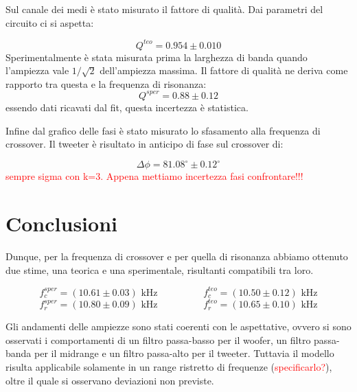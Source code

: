 \documentclass[12pt,italian]{article}
\newcommand{\err}[1]{\textcolor{red}{#1}}
\begin{document}
Sul canale dei medi è stato misurato il fattore di qualità. Dai parametri del
circuito ci si aspetta:

\begin{equation*}
	Q^{teo} = 0.954 \pm 0.010
\end{equation*}
Sperimentalmente è stata misurata prima la larghezza di banda
quando l'ampiezza vale $1/\sqrt{2}$ dell'ampiezza massima. Il fattore di
qualità ne deriva come rapporto tra questa e la frequenza di risonanza:
\begin{equation*}
	Q^{sper} = 0.88 \pm 0.12
\end{equation*}
essendo dati ricavati dal fit, questa incertezza è statistica.

Infine dal grafico delle fasi è stato misurato lo sfasamento alla frequenza di
crossover. Il tweeter è risultato in anticipo di fase sul crossover di:

\begin{equation*}
	\Delta \phi = 81.08^\circ \pm 0.12^\circ
\end{equation*}
\err{sempre sigma con k=3. Appena mettiamo incertezza fasi confrontare!!!}

\section*{Conclusioni}

Dunque, per la frequenza di crossover e per quella di risonanza abbiamo
ottenuto due stime, una teorica e una sperimentale, risultanti compatibili tra
loro.

\begin{equation*}
	f_{c}^{sper} = (10.61 \pm 0.03) \text{ kHz} \hspace{2cm}
	f_{c}^{teo} = (10.50 \pm 0.12) \text{ kHz}
\end{equation*}
\begin{equation*}
	f_{r}^{sper} = (10.80 \pm 0.09) \text{ kHz}
	\hspace{2cm} f_{r}^{teo} = (10.65 \pm 0.10) \text{ kHz}
\end{equation*}

Gli andamenti delle ampiezze sono stati coerenti con le aspettative, ovvero si
sono osservati i comportamenti di un filtro passa-basso per il woofer, un
filtro passa-banda per il midrange e un filtro passa-alto per il tweeter.
Tuttavia il modello risulta applicabile solamente in un range ristretto di
frequenze (\err{specificarlo?}), oltre il quale si osservano deviazioni non
previste.
\end{document}
